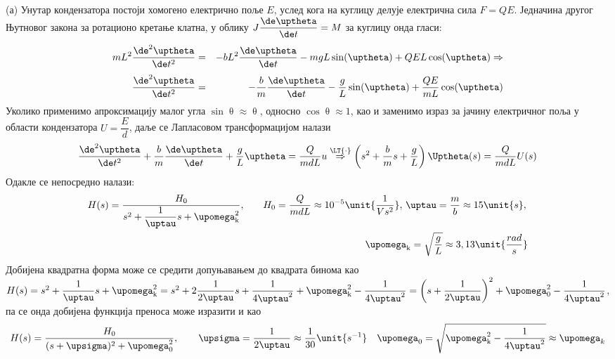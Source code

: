 \RESENJE
(а) Унутар кондензатора постоји хомогено електрично поље $E$, услед кога на куглицу 
делује електрична сила $F = QE$.
Једначина другог Њутновог закона за ротационо кретање клатна, у облику $J \dfrac{\de\uptheta}{\de t} = M$ за
куглицу онда гласи:
\begin{eqnarray} 
    mL^2 \dfrac{\de^2 \uptheta}{\de t^2} &=& - b L^2 \dfrac{\de \uptheta}{\de t} - mgL\sin(\uptheta) + QE L\cos(\uptheta) \Rightarrow \\[1mm]
    \dfrac{\de^2 \uptheta}{\de t^2} &=& - \dfrac{b}{m}  \dfrac{\de \uptheta}{\de t} - \dfrac{g}{L} \sin(\uptheta) + \dfrac{QE}{mL}\cos(\uptheta)
\end{eqnarray}
Уколико применимо апроксимацију малог угла $\sin\uptheta \approx \uptheta$, односно $\cos \uptheta \approx 1$, као и заменимо 
израз за јачину електричног поља у области кондензатора $U = \dfrac{E}{d}$, даље се Лапласовом трансформацијом налази 
\begin{eqnarray}
    \dfrac{\de^2 \uptheta}{\de t^2} + \dfrac{b}{m}  \dfrac{\de \uptheta}{\de t} + \dfrac{g}{L} \uptheta =  \dfrac{Q}{mdL} u
    \overset{{\LT{\cdot}}}{ \Rightarrow } 
    \left(
        s^2 + \dfrac{b}{m} s +  \dfrac{g}{L}
    \right) \Uptheta(s) 
    =
    \dfrac{Q}{mdL} U(s)
\end{eqnarray}
Одакле се непосредно налази:
\begin{eqnarray}
    H(s) = \dfrac{ H_0 }{s^2 + \dfrac{1}{\uptau} s + \upomega_{\rm k}^2}, \quad && H_0 = \dfrac{Q}{mdL} \approx 10^{-5} \unit{\dfrac{1}{Vs^2}} ,\, \uptau = \dfrac{m}{b} 
    \approx 15\unit{s},\,  \\
    && \upomega_{\rm k} = \sqrt{\dfrac{g}{L}} \approx 3,13\unit{\dfrac{rad}{s}}
\end{eqnarray}
Добијена квадратна форма може се средити допуњавањем до квадрата бинома као 
$ H(s) = s^2 + \dfrac{1}{\uptau} s + \upomega_{\rm k}^2 = s^2 + 2 \dfrac{1}{2\uptau} s + \dfrac{1}{4\uptau^2} + \upomega_{\rm k}^2 - \dfrac{1}{4\uptau^2} 
= \left( s + \dfrac{1}{2\uptau} \right)^2 +  \upomega_0^2 - \dfrac{1}{4\uptau^2}$, па се онда добијена функција преноса може изразити и као 
\begin{eqnarray}
    H(s) = \dfrac{H_0}{(s + \upsigma)^2 + \upomega_0^2}, \qquad \upsigma = \dfrac{1}{2\uptau} \approx \dfrac{1}{30} \unit{s^{-1}} \quad \upomega_0 = \sqrt{\upomega_{\rm k}^2 - \dfrac{1}{4\uptau^2} }
    \approx \upomega_k
\end{eqnarray}

